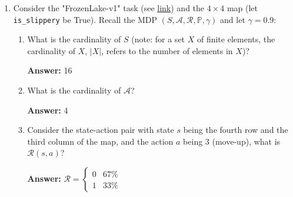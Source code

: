 \documentclass{assignment}
\date{April 24, 2024}
\begin{document}
\begin{problem}


\begin{enumerate}

    \item Consider the "FrozenLake-v1" task (see \href{https://gymnasium.farama.org/environments/toy_text/frozen_lake/}{link}) and the $4 \times 4$ map (let \texttt{is\_slippery} be True). Recall the MDP $(S, \mathcal{A}, \mathcal{R}, \mathbb{P}, \gamma)$ and let $\gamma = 0.9:$
    
    \begin{enumerate}[label=(\alph*)]

    
        \item What is the cardinality of $S$ (note: for a set $X$ of finite elements, the cardinality of $X$, $|X|$, refers to the number of elements in $X$)?

        \color{blue}\textbf{Answer:}
            16
        \color{black}


    
        \item What is the cardinality of $\mathcal{A}$?

        \color{blue}\textbf{Answer:}
            4
        \color{black}


    
        \item Consider the state-action pair with state $s$ being the fourth row and the third column of the map, and the action $a$ being 3 (move-up), what is $\mathcal{R}(s, a)$?

        \color{blue}\textbf{Answer:} 
            $\mathcal{R} = \begin{cases}
                0 & 67\% \\
                1 & 33\%
            \end{cases}$
        \color{black}


\end{enumerate}
\end{enumerate}
\end{problem}
\end{document}
